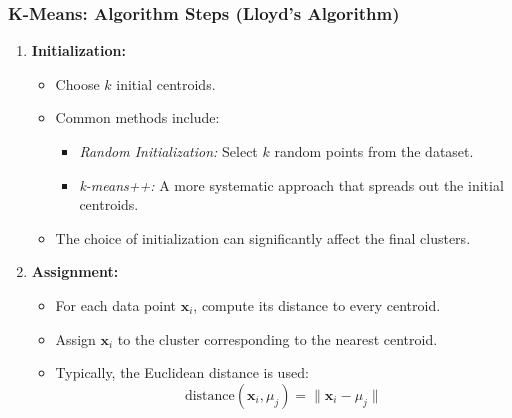 \documentclass[aspectratio=169]{beamer}
\begin{document}
\begin{frame}
    \frametitle{K-Means: Algorithm Steps (Lloyd's Algorithm)}
    \begin{enumerate}
        \item \textbf{Initialization:}
            \begin{itemize}
                \item Choose \(k\) initial centroids.
                \item Common methods include:
                    \begin{itemize}
                        \item \emph{Random Initialization:} Select \(k\) random points from the dataset.
                        \item \emph{k-means++:} A more systematic approach that spreads out the initial centroids.
                    \end{itemize}
                \item The choice of initialization can significantly affect the final clusters.
            \end{itemize}
        \item \textbf{Assignment:}
            \begin{itemize}
                \item For each data point \(\mathbf{x}_i\), compute its distance to every centroid.
                \item Assign \(\mathbf{x}_i\) to the cluster corresponding to the nearest centroid.
                \item Typically, the Euclidean distance is used:
                \[
                \text{distance}(\mathbf{x}_i, \mu_j) = \|\mathbf{x}_i - \mu_j\|
                \]
            \end{itemize}
    \end{enumerate}
    \end{frame}
    
\end{document}
